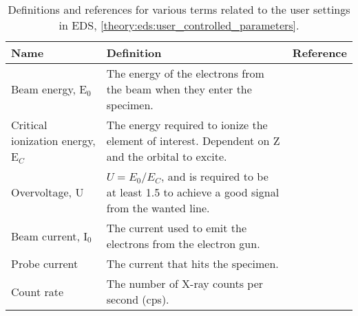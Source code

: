 \begin{table}[pht]
    \begin{center}
        \caption{Definitions and references for various terms related to the user settings in EDS, \cref{theory:eds:user_controlled_parameters}.}
        \renewcommand*{\arraystretch}{1.4}
        \label{tab:eds:userparameters}
        \begin{tabular}{p{2.6cm}p{10cm}l}
            \hline
            \textbf{Name}                     & \textbf{Definition}                                                                                                                                                                                                        & \textbf{Reference} \\
            \hline
            Beam energy, E$_0$                & The energy of the electrons from the beam when they enter the specimen.                                                                                                                                                    &                    \\
            Critical ionization energy, E$_C$ & The energy required to ionize the element of interest. Dependent on Z and the orbital to excite.                                                                                                                           &                    \\
            Overvoltage, U                    & $ U = E_0 / E_C $, and is required to be at least 1.5 to achieve a good signal from the wanted line.                                                                                                                       &                    \\
            Beam current, I$_0$               & The current used to emit the electrons from the electron gun.                                                                                                                                                              &                    \\
            Probe current                     & The current that hits the specimen.                                                                                                                                                                                        &                    \\
            Count rate                        & The number of X-ray counts per second (cps).                                                                                                                                                                               &                    \\

\end{tabular}
\end{center}
\end{table}
